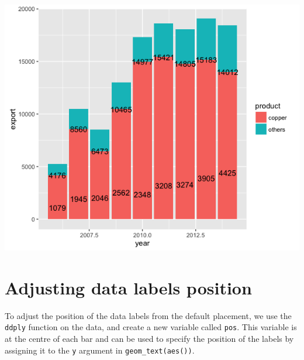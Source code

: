 \begin{center}\includegraphics[width=0.55\linewidth]{0_all_posts_pdf/bar_2-1} \end{center}

\section{Adjusting data labels
position}\label{adjusting-data-labels-position}

To adjust the position of the data labels from the default placement, we
use the \texttt{ddply} function on the data, and create a new variable
called \texttt{pos}. This variable is at the centre of each bar and can
be used to specify the position of the labels by assigning it to the
\texttt{y} argument in \texttt{geom\_text(aes())}.

\begin{Shaded}
\begin{Highlighting}[]
\StringTok{ }
\StringTok{        } \StringTok{ }\NormalTok{(} \NormalTok{*}\StringTok{ }

\StringTok{ }\NormalTok{() +}\StringTok{ }\NormalTok{(}\NormalTok{(}   
\StringTok{        } \NormalTok{) }
\StringTok{ }\StringTok{ }\NormalTok{(}\StringTok{        }\NormalTok{(}   
\StringTok{        }\NormalTok{)}
\end{Highlighting}
\end{Shaded}

